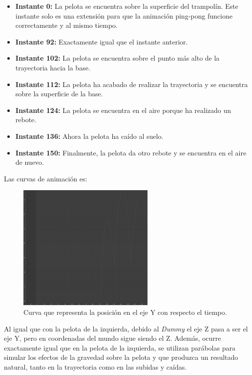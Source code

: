 \documentclass{article}
\begin{document}
\begin{itemize}
    \item \textbf{Instante 0: }La pelota se encuentra sobre la superficie del trampolín. Este instante solo es una extensión para que la animación ping-pong funcione correctamente y al mismo tiempo.
    \item \textbf{Instante 92: }Exactamente igual que el instante anterior.
    \item \textbf{Instante 102: }La pelota se encuentra sobre el punto más alto de la trayectoria hacia la base.
    \item \textbf{Instante 112: }La pelota ha acabado de realizar la trayectoria y se encuentra sobre la superficie de la base.
    \item \textbf{Instante 124: }La pelota se encuentra en el aire porque ha realizado un rebote.
    \item \textbf{Instante 136: }Ahora la pelota ha caído al suelo.
    \item \textbf{Instante 150: }Finalmente, la pelota da otro rebote y se encuentra en el aire de nuevo.
\end{itemize}

\bigskip

Las curvas de animación es:

\begin{figure}[H]
    \centering
    \includegraphics[width=0.6\textwidth]{imagenes/curvas/PR/pelota/green.png}
    \caption{Curva que representa la posición en el eje Y con respecto el tiempo.}
 \end{figure}

 Al igual que con la pelota de la izquierda, debido al \textit{Dummy} el eje Z pasa a ser el eje Y, pero en coordenadas del mundo sigue siendo el Z. Además, ocurre exactamente igual que en la pelota de la izquierda, se utilizan parábolas para simular los efectos de la gravedad sobre la pelota y que produzca un resultado natural, tanto en la trayectoria como en las subidas y caídas.
\end{document}
